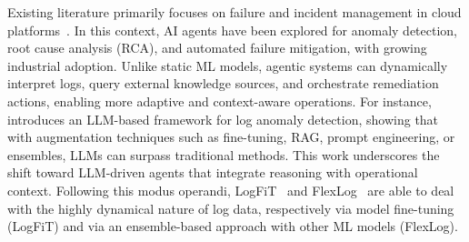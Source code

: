 \documentclass[sigconf]{acmart}
\begin{document}
Existing literature primarily focuses on failure and incident management in cloud platforms~\cite{zhang2025survey}. In this context, AI agents have been explored for anomaly detection, root cause analysis (RCA), and automated failure mitigation, with growing industrial adoption. Unlike static ML models, agentic systems can dynamically interpret logs, query external knowledge sources, and orchestrate remediation actions, enabling more adaptive and context-aware operations.
%
For instance,~\cite{delacruzcabello2025aiops} introduces an LLM-based framework for log anomaly detection, showing that with augmentation techniques such as fine-tuning, RAG, prompt engineering, or ensembles, LLMs can surpass traditional methods. This work underscores the shift toward LLM-driven agents that integrate reasoning with operational context.
%
Following this modus operandi, LogFiT~\cite{almodovar2024logfit} and FlexLog~\cite{hadadi2025llm} are able to deal with the highly dynamical nature of log data, respectively via model fine-tuning (LogFiT) and via an ensemble-based approach with other ML models (FlexLog).
\end{document}
